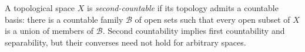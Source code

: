 
A topological space $X$ is \emph{second-countable} if its topology admits a countable basis: there is a countable family $\mathcal B$ of open sets such that every open subset of $X$ is a union of members of $\mathcal B$. Second countability implies first countability and separability, but their converses need not hold for arbitrary spaces.
